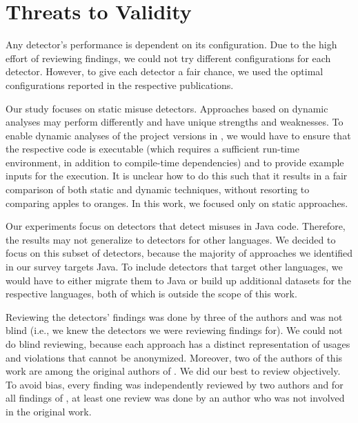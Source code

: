 
\section{Threats to Validity}
\label{sec:threats_to_validity}


Any detector's performance is dependent on its configuration. 
Due to the high effort of reviewing findings, we could not try different configurations for each detector.
However, to give each detector a fair chance, we used the optimal configurations reported in the respective publications.

Our study focuses on static misuse detectors.
Approaches based on dynamic analyses may perform differently and have unique strengths and weaknesses.
To enable dynamic analyses of the project versions in \MUBench, we would have to ensure that the respective code is executable (which requires a sufficient run-time environment, in addition to compile-time dependencies) and to provide example inputs for the execution.
It is unclear how to do this such that it results in a fair comparison of both static and dynamic techniques, without resorting to comparing apples to oranges.
In this work, we focused only on static approaches.

Our experiments focus on detectors that detect misuses in Java code.
Therefore, the results may not generalize to detectors for other languages.
We decided to focus on this subset of detectors, because the majority of approaches we identified in our survey targets Java.
To include detectors that target other languages, we would have to either migrate them to Java or build up additional datasets for the respective languages, both of which is outside the scope of this work.

Reviewing the detectors' findings was done by three of the authors and was not blind (i.e., we knew the detectors we were reviewing findings for).
We could not do blind reviewing, because each approach has a distinct representation of usages and violations that cannot be anonymized.
Moreover, two of the authors of this work are among the original authors of \GROUMiner.
We did our best to review objectively.
To avoid bias, every finding was independently reviewed by two authors and for all findings of \GROUMiner, at least one review was done by an author who was not involved in the original work.

